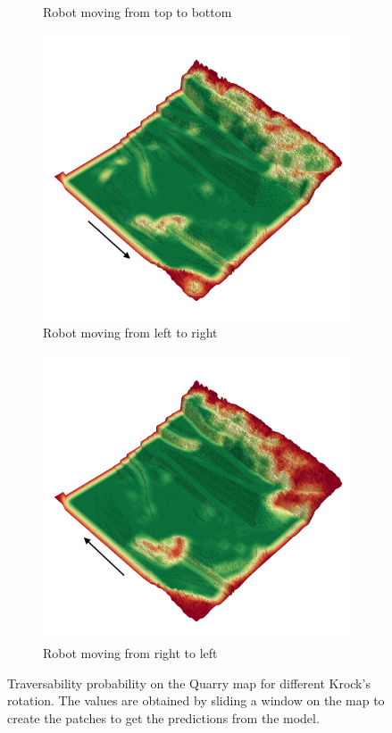 \documentclass[../document.tex]{subfiles}
\begin{document}
\begin{figure}[H]
\begin{subfigure}[b]{0.45\textwidth}
    \caption{Robot moving from top to bottom} 
    \label{fig: quarry-t2b}
\end{subfigure}
\begin{subfigure}[b]{0.45\textwidth}
  \includegraphics[width=\linewidth]{../img/4/traversability/quarry/-0.png}
  \caption{Robot moving from left to right}   
  \label{fig: quarry-l2r}
\end{subfigure}
\begin{subfigure}[b]{0.45\textwidth}
    \includegraphics[width=\linewidth]{../img/4/traversability/quarry/-180.png}  
    \caption{Robot moving from right to left} 
    \label{fig: quarry-r2l}
\end{subfigure}
\caption{Traversability probability on the Quarry map for different Krock's rotation. The values are obtained by sliding a window on the map to create the patches to get the predictions from the model.}
\end{figure}
\end{document}
